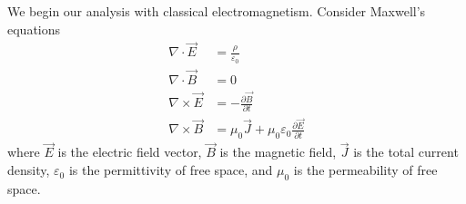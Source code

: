 
We begin our analysis with classical electromagnetism. Consider
Maxwell's equations
\begin{subequations}\label{eq:maxwell}
\begin{align}
\nabla\cdot\vec{E}&=\frac{\rho}{\varepsilon_{0}}\label{eq:gauss}\\
\nabla\cdot\vec{B}&=0\label{eq:gaussMag}\\
\nabla\times\vec{E}&=-\frac{\partial\vec{B}}{\partial t}\label{eq:faraday}\\
\nabla\times\vec{B}&=\mu_{0}\vec{J}+\mu_{0}\varepsilon_{0}\frac{\partial\vec{E}}{\partial t}\label{eq:ampere}
\end{align}
\end{subequations}
where $\vec{E}$ is the electric field vector, $\vec{B}$ is the
magnetic field, $\vec{J}$ is the total current density,
$\varepsilon_{0}$ is the permittivity of free space, and
$\mu_{0}$ is the permeability of free space.

